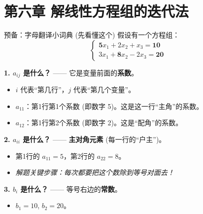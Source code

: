 \documentclass[12pt, a4paper]{article}
\begin{document}
\newpage


\section*{第六章 解线性方程组的迭代法}

\begin{knowpoint}{预备：字母翻译小词典 (先看懂这个)}
    假设有一个方程组：
    \[
    \begin{cases}
       \mathbf{5}x_1 + 2x_2 + x_3 = \mathbf{10} \\
       3x_1 + \mathbf{8}x_2 - 2x_3 = \mathbf{20}
    \end{cases}
    \]
    
    \vspace{0.5em}
    \textbf{1. $a_{ij}$ 是什么？} —— 它是变量前面的\textbf{系数}。
    \begin{itemize}
        \item $i$ 代表“第几行”，$j$ 代表“第几个变量”。
        \item $a_{11}$：第1行第1个系数 (即数字 5)。这是这一行“主角”的系数。
        \item $a_{12}$：第1行第2个系数 (即数字 2)。这是“配角”的系数。
    \end{itemize}
    \textbf{2. $a_{ii}$ 是什么？} —— \textbf{主对角元素} (每一行的“户主”)。
    \begin{itemize}
        \item 第1行的 $a_{11}=5$，第2行的 $a_{22}=8$。
        \item \textit{解题关键步骤：每次都要把这个数除到等号对面去！}
    \end{itemize}
    \textbf{3. $b_i$ 是什么？} —— 等号右边的\textbf{常数}。
    \begin{itemize}
        \item $b_1 = 10$, $b_2 = 20$。
    \end{itemize}
\end{knowpoint}
\end{document}
